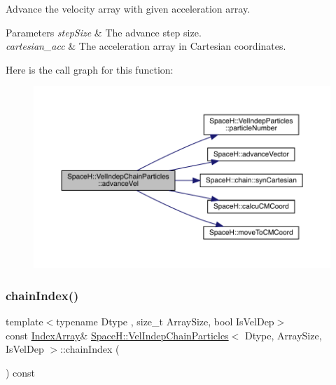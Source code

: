 Advance the velocity array with given acceleration array. 


\begin{DoxyParams}{Parameters}
{\em step\+Size} & The advance step size. \\
\hline
{\em cartesian\+\_\+acc} & The acceleration array in Cartesian coordinates. \\
\hline
\end{DoxyParams}
Here is the call graph for this function\+:
\nopagebreak
\begin{figure}[H]
\begin{center}
\leavevmode
\includegraphics[width=350pt]{class_space_h_1_1_vel_indep_chain_particles_ae5253fbb69161c625f878de540618eb7_cgraph}
\end{center}
\end{figure}
\mbox{\label{class_space_h_1_1_vel_indep_chain_particles_a4136b399758a4547ce22024318d9b654}} 
\subsubsection{\texorpdfstring{chain\+Index()}{chainIndex()}\hspace{0.1cm}{\footnotesize\ttfamily [1/4]}}
{\footnotesize\ttfamily template$<$typename Dtype , size\+\_\+t Array\+Size, bool Is\+Vel\+Dep$>$ \\
const \mbox{\hyperlink{class_space_h_1_1_vel_indep_chain_particles_a48b9183f8d68fe8af42bf405125d450c}{Index\+Array}}\& \mbox{\hyperlink{class_space_h_1_1_vel_indep_chain_particles}{Space\+H\+::\+Vel\+Indep\+Chain\+Particles}}$<$ Dtype, Array\+Size, Is\+Vel\+Dep $>$\+::chain\+Index (\begin{DoxyParamCaption}{ }\end{DoxyParamCaption}) const\hspace{0.3cm}{\ttfamily [inline]}}



